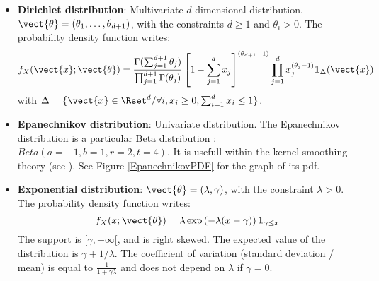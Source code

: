 {\begin{itemize}
\begin{figure}[H]
\begin{minipage}{8cm}
\begin{center}
\texttt{[image: Figures/pdf\_ChiSquare\_1.png]}
\caption{PDF of a Chi Square distribution.}
\end{center}
\end{minipage}
\hfill
\begin{minipage}{8cm}
\begin{center}
\texttt{[image: Figures/pdf\_ChiSquare\_2.png]}
\caption{PDF of a Chi Square distribution.}
\end{center}
\end{minipage}
\end{figure}

\begin{figure}[H]
\begin{center}
\texttt{[image: Figures/pdf\_ChiSquare\_3.png]}
\caption{PDF of a Chi Square distribution.}
\end{center}
\end{figure}


\item {\bf Dirichlet distribution}: Multivariate $d$-dimensional distribution. $\vect{\theta} = ( \theta_1, \hdots, \theta_{d+1})$, with the constraints $d \geq 1$ and $\theta_i>0$. The probability density function writes:
\begin{equation}
f_X(\vect{x};\vect{\theta}) = \displaystyle \frac{\Gamma(\sum_{j=1}^{d+1}\theta_j)}{\prod_{j=1}^{d+1}\Gamma(\theta_j)} \left[ 1-\sum_{j=1}^{d} x_j\right]^{(\theta_{d+1}-1)}\prod_{j=1}^d x_j^{(\theta_j-1)}\mathbf{1}_{\Delta}(\vect{x})
\end{equation}
with $\Delta = \{ \vect{x} \in \Rset^d / \forall i, x_i \geq 0, \sum_{i=1}^{d} x_i \leq 1 \}$.



\item {\bf Epanechnikov distribution}: Univariate distribution. The Epanechnikov distribution is a particular Beta distribution : $Beta (a=-1, b=1, r=2, t=4)$. It is usefull within the kernel smoothing theory (see ). See Figure \ref{EpanechnikovPDF} for the graph of its pdf.


\item {\bf Exponential distribution}: $\vect{\theta} = \left( \lambda, \gamma \right)$, with the constraint $\lambda>0$. The probability density function writes:
\begin{equation}
f_X(x;\vect{\theta}) = \lambda \exp \left( -\lambda(x-\gamma) \right) \mathbf{1}_{\gamma \leq x}
\end{equation}
The support is $[\gamma,+\infty[$, and is right skewed. The expected value of the distribution is $\gamma + 1/\lambda$. The coefficient of variation (standard deviation / mean) is equal to $\frac{1}{1+\gamma\lambda}$ and does not depend on $\lambda$ if $\gamma=0$.



\end{itemize}}
